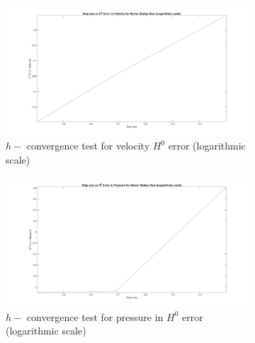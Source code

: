 \documentclass[a4paper]{book}
\begin{document}
\begin{figure}
\begin{subfigure}{\textwidth}	
  \includegraphics[width=\linewidth]{H0_convergence_velocity_n_s_log.jpg}
  \caption{$h-$ convergence test for velocity $H^0$ error (logarithmic scale)}
  \label{fig:vel_navier_stoke_conv_log_h0}
\end{subfigure}
\begin{subfigure}{\textwidth}	
  \includegraphics[width=\linewidth]{H0_convergence_pressure_n_s_log.jpg}
  \caption{$h-$ convergence test for pressure in $H^0$ error (logarithmic scale)}
  \label{fig:pre_navier_stoke_conv_log_h0}
\end{subfigure}
\caption{\label{navier_stoke_conv_h0_log}}
\end{figure}
\end{document}
